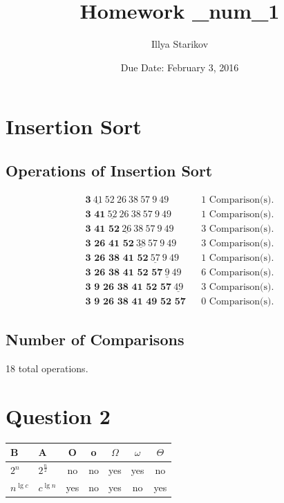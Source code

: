 \documentclass{article}
\begin{document}
\author{Illya Starikov}
\title{Homework \_num_1}
\date{Due Date: February 3, 2016}
\maketitle

\section{Insertion Sort}
\subsection{Operations of Insertion Sort}
\begin{eqnarray*}
\textbf{3} \ \underline{41} \ 52 \ 26 \ 38 \ 57 \ 9 \ 49  & & \text{1 Comparison(s).} \\
\textbf{3 41} \ \underline{52} \ 26 \ 38 \ 57 \ 9 \ 49  & & \text{1 Comparison(s).} \\
\textbf{3 41 52} \ \underline{26} \ 38 \ 57 \ 9 \ 49  & & \text{3 Comparison(s).} \\
\textbf{3 26 41 52} \ \underline{38} \ 57 \ 9 \ 49  & & \text{3 Comparison(s).} \\
\textbf{3 26 38 41 52} \ \underline{57} \ 9 \ 49  & & \text{1 Comparison(s).} \\
\textbf{3 26 38 41 52 57} \ \underline{9} \ 49  & & \text{6 Comparison(s).} \\
\textbf{3 9 26 38 41 52 57} \ \underline{49}  & & \text{3 Comparison(s).} \\
\textbf{3 9 26 38 41 49 52 57} & & \text{0 Comparison(s).}
\end{eqnarray*}

\subsection{Number of Comparisons}
18 total operations.

\section{Question 2}
\begin{center}
\begin{tabular}{| l | l | c | c | c | c | c |}
 \hline
B & A & O & o & $\Omega$ & $\omega$ & $\Theta$ \\ \hline
$2^n$ & $2^\frac{n}{2}$ & no & no & yes & yes & no \\ \hline
$n^{\lg c}$ & $c^{\lg n}$ & yes & no & yes & no & yes \\ \hline
\end{tabular}
\end{center}
\end{document}
